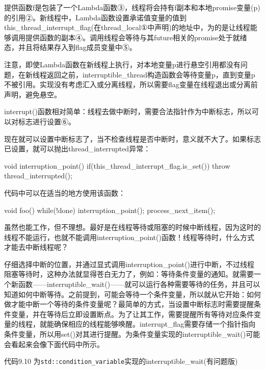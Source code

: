 提供函数f是包装了一个Lambda函数③，线程将会持有f副本和本地promise变量(p)的引用②。新线程中，Lambda函数设置承诺值变量的值到this\_thread\_interrupt\_flag(在thread\_local①中声明)的地址中，为的是让线程能够调用提供函数的副本④。调用线程会等待与其future相关的promise处于就绪态，并且将结果存入到flag成员变量中⑤。

注意，即使Lambda函数在新线程上执行，对本地变量p进行悬空引用都没有问题，在新线程返回之前，interruptible\_thread构造函数会等待变量p，直到变量p不被引用。实现没有考虑汇入或分离线程，所以需要flag变量在线程退出或分离前声明，避免悬空。

interrupt()函数相对简单：线程去做中断时，需要合法指针作为中断标志，所以可以对标志进行设置⑥。


现在就可以设置中断标志了，当不检查线程是否中断时，意义就不大了。如果标志已设置，就可以抛出thread\_interrupted异常：

\begin{cpp}
void interruption_point()
{
  if(this_thread_interrupt_flag.is_set())
  {
    throw thread_interrupted();
  }
}
\end{cpp}

代码中可以在适当的地方使用该函数：

\begin{cpp}
void foo()
{
  while(!done)
  {
    interruption_point();
    process_next_item();
  }
}
\end{cpp}

虽然也能工作，但不理想。最好是在线程等待或阻塞的时候中断线程，因为这时的线程不能运行，也就不能调用interruption\_point()函数！线程等待时，什么方式才能去中断线程呢？


仔细选择中断的位置，并通过显式调用interruption\_point()进行中断，不过线程阻塞等待时，这种办法就显得苍白无力了，例如：等待条件变量的通知。就需要一个新函数——interruptible\_wait()——就可以运行各种需要等待的任务，并且可以知道如何中断等待。之前提到，可能会等待一个条件变量，所以就从它开始：如何做才能中断一个等待的条件变量呢？最简单的方式，当设置中断标志时需要提醒条件变量，并在等待后立即设置断点。为了让其工作，需要提醒所有等待对应条件变量的线程，就能确保相应的线程能够唤醒。interrupt\_flag需要存储一个指针指向条件变量，所以用set()对其进行提醒。为条件变量实现的interruptible\_wait()可能会看起来会像下面代码中所示。

代码9.10 为\texttt{std::condition\_variable}实现的interruptible\_wait(有问题版)

